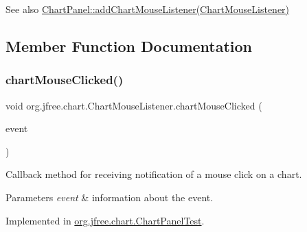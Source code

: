 \begin{DoxySeeAlso}{See also}
\mbox{\hyperlink{classorg_1_1jfree_1_1chart_1_1_chart_panel_ac52adbd22476ece66a369804778b0a3d}{Chart\+Panel\+::add\+Chart\+Mouse\+Listener(\+Chart\+Mouse\+Listener)}} 
\end{DoxySeeAlso}


\subsection{Member Function Documentation}
\mbox{\label{interfaceorg_1_1jfree_1_1chart_1_1_chart_mouse_listener_afa372155dc6454a3fbfb0b5118b15f39}} 
\subsubsection{\texorpdfstring{chart\+Mouse\+Clicked()}{chartMouseClicked()}}
{\footnotesize\ttfamily void org.\+jfree.\+chart.\+Chart\+Mouse\+Listener.\+chart\+Mouse\+Clicked (\begin{DoxyParamCaption}\item[{\mbox{\hyperlink{classorg_1_1jfree_1_1chart_1_1_chart_mouse_event}{Chart\+Mouse\+Event}}}]{event }\end{DoxyParamCaption})}

Callback method for receiving notification of a mouse click on a chart.


\begin{DoxyParams}{Parameters}
{\em event} & information about the event. \\
\hline
\end{DoxyParams}


Implemented in \mbox{\hyperlink{classorg_1_1jfree_1_1chart_1_1_chart_panel_test_a8c56580e9af6f212e2b587673913be07}{org.\+jfree.\+chart.\+Chart\+Panel\+Test}}.

\mbox{\label{interfaceorg_1_1jfree_1_1chart_1_1_chart_mouse_listener_acc035e045f3d957c0ce9e6b5ab4fbecd}} 
